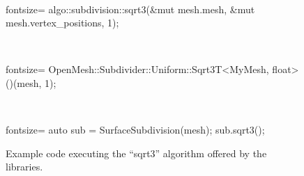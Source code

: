 \begin{figure}[p]
\vspace{2mm}
  \\[-3mm]

  \hspace{.04\textwidth}
  \begin{minipage}{.9\textwidth}
    \begin{rustcode*}{fontsize=\footnotesize}
      algo::subdivision::sqrt3(&mut mesh.mesh, &mut mesh.vertex_positions, 1);
    \end{rustcode*}
  \end{minipage}\vspace{2mm}

  \vspace{2mm}
  \\[-3mm]

  \hspace{.04\textwidth}
  \begin{minipage}{.9\textwidth}
    \begin{cppcode*}{fontsize=\footnotesize}
      OpenMesh::Subdivider::Uniform::Sqrt3T<MyMesh, float>()(mesh, 1);
    \end{cppcode*}
  \end{minipage}\vspace{2mm}

  \vspace{2mm}
  \\[-3mm]

  \hspace{.04\textwidth}
  \begin{minipage}{.9\textwidth}
    \begin{cppcode*}{fontsize=\footnotesize}
      auto sub = SurfaceSubdivision(mesh);
      sub.sqrt3();
    \end{cppcode*}
  \end{minipage}

  \caption{
    Example code executing the \enquote{sqrt3} algorithm offered by the libraries.
  }
\end{figure}

